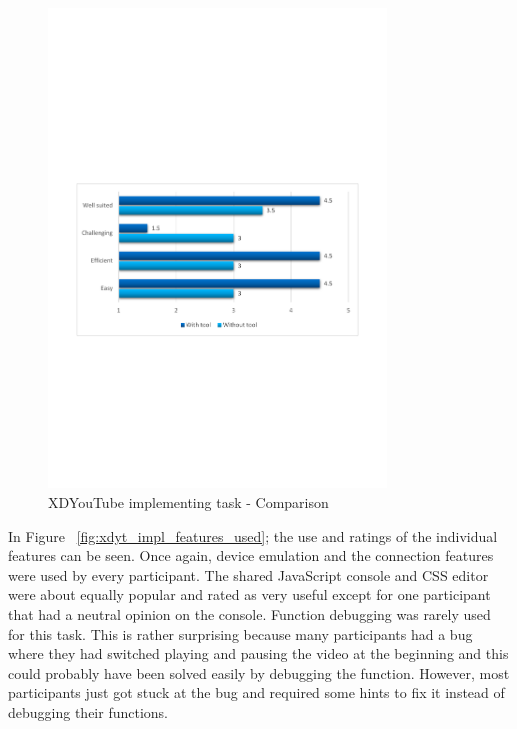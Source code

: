 \begin{figure}[H]
  \centering
    \includegraphics[width=0.8\textwidth]{images/charts/xdyt_impl_comparison.pdf}
	\caption{XDYouTube implementing task - Comparison}
	\label{fig:xdyt_impl_comparison}
\end{figure}

In Figure ~\ref{fig:xdyt_impl_features_used}; the use and ratings of the individual features can be seen. Once again, device emulation and the connection features were used by every participant. The shared JavaScript console and CSS editor were about equally popular and rated as very useful except for one participant that had a neutral opinion on the console. Function debugging was rarely used for this task. This is rather surprising because many participants had a bug where they had switched playing and pausing the video at the beginning and this could probably have been solved easily by debugging the function. However, most participants just got stuck at the bug and required some hints to fix it instead of debugging their functions.

